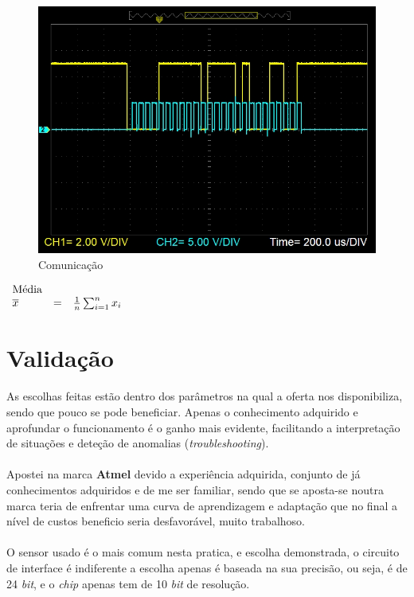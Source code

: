 \begin{figure}[H]
	\centering
	\includegraphics[scale=0.65]{./image/PESTA/graph/DataClkPacket_1.JPG}
	\caption{Comunicação}
	\label{DataClkPacket_1}
\end{figure}


$\begin{array}{l l l}
	\text{Média} & & \\
	\overline{x} & = & \frac{1}{n}\sum_{i=1}^n x_i
\end{array}$

\section{Validação}
As escolhas feitas estão dentro dos parâmetros na qual a oferta nos disponibiliza, sendo que pouco se pode beneficiar. Apenas o conhecimento adquirido e aprofundar o funcionamento é o ganho mais evidente, facilitando a interpretação de situações e deteção de anomalias (\textit{troubleshooting}).\\
\\
Apostei na marca \textbf{Atmel} devido a experiência adquirida, conjunto de já conhecimentos adquiridos e de me ser familiar, sendo que se aposta-se noutra marca teria de enfrentar uma curva de aprendizagem e adaptação que no final a nível de custos beneficio seria desfavorável, muito trabalhoso.\\
\\
O sensor usado é o mais comum nesta pratica, e escolha demonstrada, o circuito de interface é indiferente a escolha apenas é baseada na sua precisão, ou seja, é de 24 \textit{bit}, e o \textit{chip} apenas tem  de 10 \textit{bit} de resolução.
\\
\\

